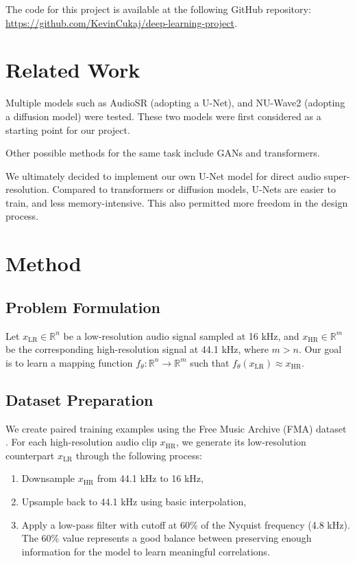 \documentclass{article}
\begin{document}
The code for this project is available at the following GitHub repository: \url{https://github.com/KevinCukaj/deep-learning-project}.

\section{Related Work}

Multiple models such as AudioSR \cite{liu2024audiosr} (adopting a U-Net), and NU-Wave2 \cite{han2022nu} (adopting a diffusion model) were tested.
These two models were first considered as a starting point for our project.

Other possible methods for the same task include GANs and transformers.

We ultimately decided to implement our own U-Net model for direct audio super-resolution. 
Compared to transformers or diffusion models, U-Nets are easier to train, and less memory-intensive.
This also permitted more freedom in the design process.

\section{Method}

\subsection{Problem Formulation}
Let $x_{\text{LR}} \in \mathbb{R}^n$ be a low-resolution audio signal sampled at 16 kHz, and $x_{\text{HR}} \in \mathbb{R}^m$ be the corresponding high-resolution signal at 44.1 kHz, where $m > n$. Our goal is to learn a mapping function $f_\theta: \mathbb{R}^n \rightarrow \mathbb{R}^m$ such that $f_\theta(x_{\text{LR}}) \approx x_{\text{HR}}$.

\subsection{Dataset Preparation}
We create paired training examples using the Free Music Archive (FMA) dataset \cite{fma_dataset}. 
For each high-resolution audio clip $x_{\text{HR}}$, we generate its low-resolution counterpart $x_{\text{LR}}$ through the following process:
\begin{enumerate}
    \item Downsample $x_{\text{HR}}$ from 44.1 kHz to 16 kHz,
    \item Upsample back to 44.1 kHz using basic interpolation,
    \item Apply a low-pass filter with cutoff at 60\% of the Nyquist frequency (4.8 kHz). The 60\% value represents a good balance between preserving enough information for the model to learn meaningful correlations.
\end{enumerate}
\end{document}
